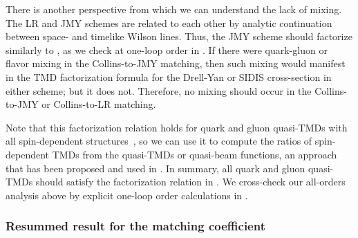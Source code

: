 \documentclass[11pt,a4paper]{article}
\begin{document}
There is another perspective from which we can understand the lack of mixing. 
The LR and JMY schemes are related to each other by analytic continuation between space- and timelike Wilson lines. Thus, the JMY scheme should factorize similarly to , as we check at one-loop order in . If there were quark-gluon or flavor mixing in the Collins-to-JMY matching, then such mixing would manifest in the TMD factorization formula for the Drell-Yan or SIDIS cross-section in either scheme; but it does not.
Therefore, no mixing should occur in the Collins-to-JMY or Collins-to-LR matching. 

Note that this factorization relation holds for quark and gluon quasi-TMDs with all spin-dependent structures~\cite{Ebert:2020gxr,Vladimirov:2020ofp}, so we can use it to compute the ratios of spin-dependent TMDs from the quasi-TMDs or quasi-beam functions, an approach that has been proposed and used in .
%
In summary, all quark and gluon quasi-TMDs should satisfy the factorization relation in .
We cross-check our all-orders analysis above by explicit one-loop order calculations in . 

\subsubsection{Resummed result for the matching coefficient}
\label{sec:rgp}
\end{document}
